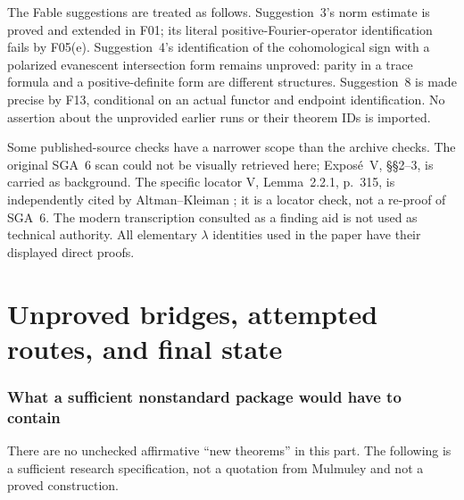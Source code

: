 \documentclass[11pt,a4paper]{article}
\newcommand{\fid}[1]{\textsf{#1}}\newcommand{\gate}[1]{\textsf{#1}}
\theoremstyle{named}\newtheorem{finding}{Finding}[section]
\theoremstyle{definition}\newtheorem{definition}[finding]{Definition}
\theoremstyle{remark}\newtheorem{remark}[finding]{Remark}
\begin{document}
The Fable suggestions are treated as follows. Suggestion~3's norm estimate is proved and extended in \fid{F01}; its literal positive-Fourier-operator identification fails by \fid{F05}(e). Suggestion~4's identification of the cohomological sign with a polarized evanescent intersection form remains unproved: parity in a trace formula and a positive-definite form are different structures. Suggestion~8 is made precise by \fid{F13}, conditional on an actual functor and endpoint identification. No assertion about the unprovided earlier runs or their theorem IDs is imported.

Some published-source checks have a narrower scope than the archive checks. The original SGA~6 scan could not be visually retrieved here; Expos\'e~V, \S\S2--3, is carried as background. The specific locator V, Lemma~2.2.1, p.~315, is independently cited by Altman--Kleiman \cite[\S2.10]{AK}; it is a locator check, not a re-proof of SGA~6. The modern transcription consulted as a finding aid is not used as technical authority. All elementary $\lambda$ identities used in the paper have their displayed direct proofs.

\part{Unproved bridges, attempted routes, and final state}
\section{What a sufficient nonstandard package would have to contain}\label{sec:gates}
There are no unchecked affirmative ``new theorems'' in this part. The following is a sufficient research specification, not a quotation from Mulmuley and not a proved construction.
\end{document}

